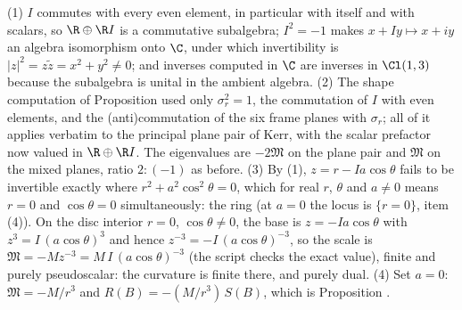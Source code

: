 (1) $I$ commutes with every even element, in particular with itself and with scalars, so $\R \oplus \R I$ is a commutative subalgebra; $I^2 = -1$ makes $x + Iy \mapsto x + iy$ an algebra isomorphism onto $\C$, under which invertibility is $|z|^2 = z\tilde z = x^2 + y^2 \neq 0$; and inverses computed in $\C$ are inverses in $\Cl(1,3)$ because the subalgebra is unital in the ambient algebra. (2) The shape computation of Proposition  used only $\sigma_r^2 = 1$, the commutation of $I$ with even elements, and the (anti)commutation of the six frame planes with $\sigma_r$; all of it applies verbatim to the principal plane pair of Kerr, with the scalar prefactor now valued in $\R \oplus \R I$. The eigenvalues are $-2\mathfrak M$ on the plane pair and $\mathfrak M$ on the mixed planes, ratio $2 : (-1)$ as before. (3) By (1), $z = r - Ia\cos\theta$ fails to be invertible exactly where $r^2 + a^2\cos^2\theta = 0$, which for real $r$, $\theta$ and $a \neq 0$ means $r = 0$ and $\cos\theta = 0$ simultaneously: the ring (at $a = 0$ the locus is $\{r = 0\}$, item (4)). On the disc interior $r = 0$, $\cos\theta \neq 0$, the base is $z = -Ia\cos\theta$ with $z^3 = I\,(a\cos\theta)^3$ and hence $z^{-3} = -I\,(a\cos\theta)^{-3}$, so the scale is $\mathfrak M = -M z^{-3} = M\,I\,(a\cos\theta)^{-3}$ (the script checks the exact value), finite and purely pseudoscalar: the curvature is finite there, and purely dual. (4) Set $a = 0$: $\mathfrak M = -M/r^3$ and $R(B) = -(M/r^3)\,S(B)$, which is Proposition .
